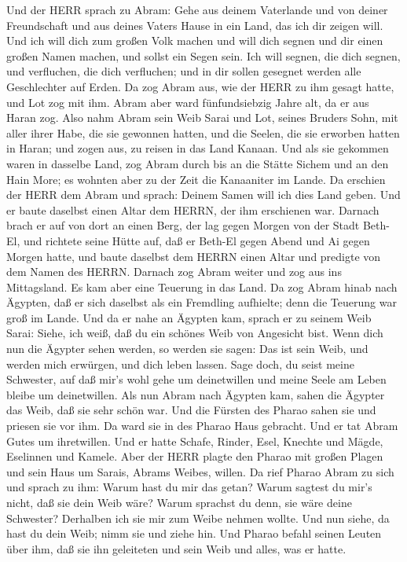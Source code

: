  Und der HERR sprach zu Abram: Gehe aus deinem Vaterlande
und von deiner Freundschaft und aus deines Vaters Hause in ein Land, das
ich dir zeigen will.  Und ich will dich zum großen Volk
machen und will dich segnen und dir einen großen Namen machen, und
sollst ein Segen sein.  Ich will segnen, die dich segnen,
und verfluchen, die dich verfluchen; und in dir sollen gesegnet werden
alle Geschlechter auf Erden.  Da zog Abram aus, wie der HERR
zu ihm gesagt hatte, und Lot zog mit ihm. Abram aber ward fünfundsiebzig
Jahre alt, da er aus Haran zog.  Also nahm Abram sein Weib
Sarai und Lot, seines Bruders Sohn, mit aller ihrer Habe, die sie
gewonnen hatten, und die Seelen, die sie erworben hatten in Haran; und
zogen aus, zu reisen in das Land Kanaan. Und als sie gekommen waren in
dasselbe Land,  zog Abram durch bis an die Stätte Sichem und
an den Hain More; es wohnten aber zu der Zeit die Kanaaniter im Lande.
 Da erschien der HERR dem Abram und sprach: Deinem Samen
will ich dies Land geben. Und er baute daselbst einen Altar dem HERRN,
der ihm erschienen war.  Darnach brach er auf von dort an
einen Berg, der lag gegen Morgen von der Stadt Beth-El, und richtete
seine Hütte auf, daß er Beth-El gegen Abend und Ai gegen Morgen hatte,
und baute daselbst dem HERRN einen Altar und predigte von dem Namen des
HERRN.  Darnach zog Abram weiter und zog aus ins
Mittagsland.  Es kam aber eine Teuerung in das Land. Da zog
Abram hinab nach Ägypten, daß er sich daselbst als ein Fremdling
aufhielte; denn die Teuerung war groß im Lande.  Und da er
nahe an Ägypten kam, sprach er zu seinem Weib Sarai: Siehe, ich weiß,
daß du ein schönes Weib von Angesicht bist.  Wenn dich nun
die Ägypter sehen werden, so werden sie sagen: Das ist sein Weib, und
werden mich erwürgen, und dich leben lassen.  Sage doch, du
seist meine Schwester, auf daß mir's wohl gehe um deinetwillen und meine
Seele am Leben bleibe um deinetwillen.  Als nun Abram nach
Ägypten kam, sahen die Ägypter das Weib, daß sie sehr schön war.
 Und die Fürsten des Pharao sahen sie und priesen sie vor
ihm. Da ward sie in des Pharao Haus gebracht.  Und er tat
Abram Gutes um ihretwillen. Und er hatte Schafe, Rinder, Esel, Knechte
und Mägde, Eselinnen und Kamele.  Aber der HERR plagte den
Pharao mit großen Plagen und sein Haus um Sarais, Abrams Weibes, willen.
 Da rief Pharao Abram zu sich und sprach zu ihm: Warum hast
du mir das getan? Warum sagtest du mir's nicht, daß sie dein Weib wäre?
 Warum sprachst du denn, sie wäre deine Schwester?
Derhalben ich sie mir zum Weibe nehmen wollte. Und nun siehe, da hast du
dein Weib; nimm sie und ziehe hin.  Und Pharao befahl
seinen Leuten über ihm, daß sie ihn geleiteten und sein Weib und alles,
was er hatte.

